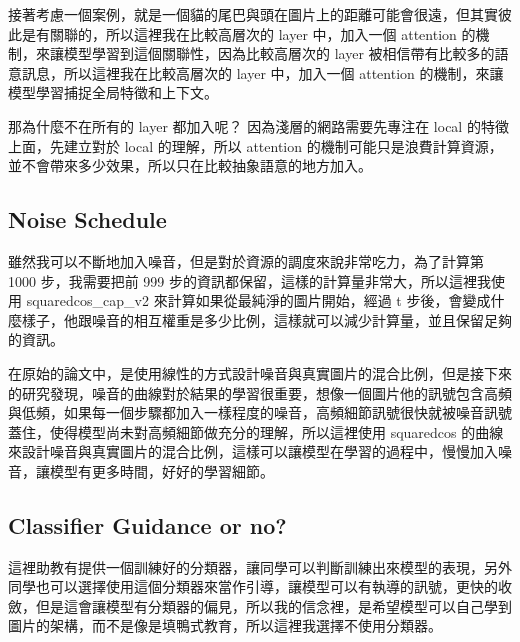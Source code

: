 接著考慮一個案例，就是一個貓的尾巴與頭在圖片上的距離可能會很遠，但其實彼此是有關聯的，所以這裡我在比較高層次的 layer 中，加入一個 attention 的機制，來讓模型學習到這個關聯性，因為比較高層次的 layer 被相信帶有比較多的語意訊息，所以這裡我在比較高層次的 layer 中，加入一個 attention 的機制，來讓模型學習捕捉全局特徵和上下文。

那為什麼不在所有的 layer 都加入呢？ 因為淺層的網路需要先專注在 local 的特徵上面，先建立對於 local 的理解，所以 attention 的機制可能只是浪費計算資源，並不會帶來多少效果，所以只在比較抽象語意的地方加入。




\subsection{Noise Schedule}
雖然我可以不斷地加入噪音，但是對於資源的調度來說非常吃力，為了計算第 1000 步，我需要把前 999 步的資訊都保留，這樣的計算量非常大，所以這裡我使用 squaredcos\_cap\_v2 來計算如果從最純淨的圖片開始，經過 t 步後，會變成什麼樣子，他跟噪音的相互權重是多少比例，這樣就可以減少計算量，並且保留足夠的資訊。

在原始的論文中，是使用線性的方式設計噪音與真實圖片的混合比例，但是接下來的研究發現，噪音的曲線對於結果的學習很重要，想像一個圖片他的訊號包含高頻與低頻，如果每一個步驟都加入一樣程度的噪音，高頻細節訊號很快就被噪音訊號蓋住，使得模型尚未對高頻細節做充分的理解，所以這裡使用 squaredcos 的曲線來設計噪音與真實圖片的混合比例，這樣可以讓模型在學習的過程中，慢慢加入噪音，讓模型有更多時間，好好的學習細節。











\subsection{Classifier Guidance or no?}

這裡助教有提供一個訓練好的分類器，讓同學可以判斷訓練出來模型的表現，另外同學也可以選擇使用這個分類器來當作引導，讓模型可以有執導的訊號，更快的收斂，但是這會讓模型有分類器的偏見，所以我的信念裡，是希望模型可以自己學到圖片的架構，而不是像是填鴨式教育，所以這裡我選擇不使用分類器。




